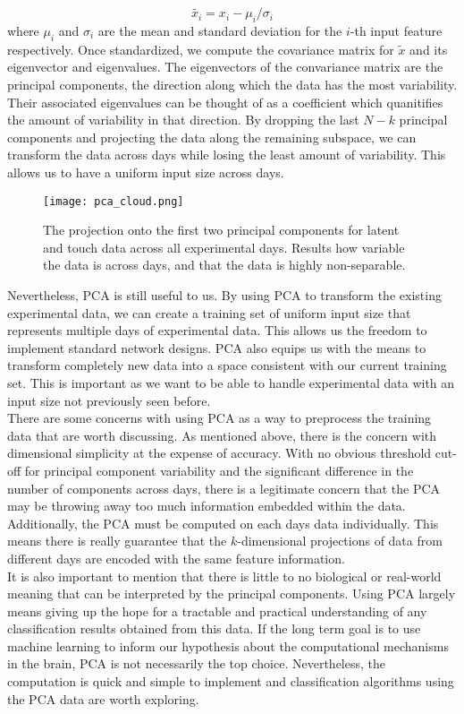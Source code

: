 \documentclass[12pt]{article}
\begin{document}
$$ \tilde{x_i} = x_i - \mu_i / \sigma_i $$
where $\mu_i$ and $\sigma_i$ are the mean and standard deviation for the $i$-th input feature respectively. Once standardized, we compute the covariance matrix for $\tilde{x}$ and its eigenvector and eigenvalues. The eigenvectors of the convariance matrix are the principal components, the direction along which the data has the most variability. Their associated eigenvalues can be thought of as a coefficient which quanitifies the amount of variability in that direction. By dropping the last $N-k$ principal components and projecting the data along the remaining subspace, we can transform the data across days while losing the least amount of variability. This allows us to have a uniform input size across days. \\
 \begin{figure}
   \centering
  \texttt{[image: pca\_cloud.png]}
  \caption{The projection onto the first two principal components for latent and touch data across all experimental days. Results how variable the data is across days, and that the data is highly non-separable.}
  \label{ref:pca_cloud}
  \end{figure}
Nevertheless, PCA is still useful to us. By using PCA to transform the existing experimental data, we can create a training set of uniform input size that represents multiple days of experimental data. This allows us the freedom to implement standard network designs. PCA also equips us with the means to transform completely new data into a space consistent with our current training set. This is important as we want to be able to handle experimental data with an input size not previously seen before. \\
\indent There are some concerns with using PCA as a way to preprocess the training data that are worth discussing. As mentioned above, there is the concern with  dimensional simplicity at the expense of accuracy. With no obvious threshold cut-off for principal component variability and the significant difference in the number of components across days, there is a legitimate concern that the PCA may be throwing away too much information embedded within the data. Additionally, the PCA must be computed on each days data individually. This means there is really guarantee that the $k$-dimensional projections of data from different days are encoded with the same feature information.\\
 \indent It is also important to mention that there is little to no biological or real-world meaning that can be interpreted by the principal components. Using PCA largely means giving up the hope for a tractable and practical understanding of any classification results obtained from this data. If the long term goal is to use machine learning to inform our hypothesis about the computational mechanisms in the brain, PCA is not necessarily the top choice. Nevertheless, the computation is quick and simple to implement and classification algorithms using the PCA data are worth exploring. \\
\end{document}
